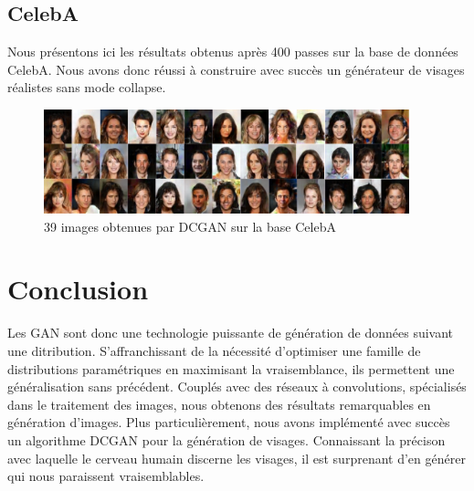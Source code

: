 \subsection{CelebA}

Nous présentons ici les résultats obtenus après 400 passes sur la base de données CelebA. Nous avons donc réussi à construire avec succès un générateur de visages réalistes sans mode collapse.

\begin{figure}[!h]
\centering
\includegraphics[width=300pt]{"images/GAN/DCGAN"}
\caption{39 images obtenues par DCGAN sur la base CelebA}
\label{celeb_gan}
\end{figure}

\section{Conclusion}

Les GAN sont donc une technologie puissante de génération de données suivant une ditribution. S'affranchissant de la nécessité d'optimiser une famille de distributions paramétriques en maximisant la vraisemblance, ils permettent une généralisation sans précédent. Couplés avec des réseaux à convolutions, spécialisés dans le traitement des images, nous obtenons des résultats remarquables en génération d'images. Plus particulièrement, nous avons implémenté avec succès un algorithme DCGAN pour la génération de visages. Connaissant la précison avec laquelle le cerveau humain discerne les visages, il est surprenant d'en générer qui nous paraissent vraisemblables.